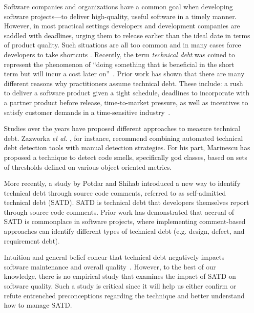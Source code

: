 
Software companies and organizations have a common goal when developing software projects---to deliver high-quality, useful software in a timely manner. However, in most practical settings developers and development companies are saddled with deadlines, urging them to release earlier than the ideal date in terms of product quality. Such situations are all too common and in many cases force developers to take shortcuts \cite{kruchten2013technical} \cite{seaman2015technical}. Recently, the term \emph{technical debt} was coined to represent the phenomenon of ``doing something that is beneficial in the short term but will incur a cost later on''~\cite{cunningham1993wycash}. Prior work has shown that there are many different reasons why practitioners assume technical debt. These include: a rush to deliver a software product given a tight schedule, deadlines to incorporate with a partner product before release, time-to-market pressure, as well as incentives to satisfy customer demands in a time-sensitive industry~\cite{lim2012balancing}.

Studies over the years have proposed different approaches to measure technical debt. Zazworka \textit{et al.} \cite{zazworka2011investigating}, for instance, recommend combining automated technical debt detection tools with manual detection strategies. For his part, Marinescu \cite{marinescu2004detection} has proposed a technique to detect code smells, specifically god classes, based on sets of thresholds defined on various object-oriented metrics.

More recently, a study by Potdar and Shihab \cite{ICSM_PotdarS14} introduced a new way to identify technical debt through source code comments, referred to as self-admitted technical debt (SATD). SATD is technical debt that developers themselves report through source code comments. Prior work \cite{MTD15p9} has demonstrated that accrual of SATD is commonplace in software projects, where implementing comment-based approaches can identify different types of technical debt (e.g. design, defect, and requirement debt).\par

Intuition and general belief concur that technical debt negatively impacts software maintenance and overall quality~\cite{zazworka2011investigating,spinola2013investigating,GuoSGCTSSS11,seaman2015technical,kruchten2013technical}. However, to the best of our knowledge, there is no empirical study that examines the impact of SATD on software quality. Such a study is critical since it will help us either confirm or refute entrenched preconceptions regarding the technique and better understand how to manage SATD.\par

